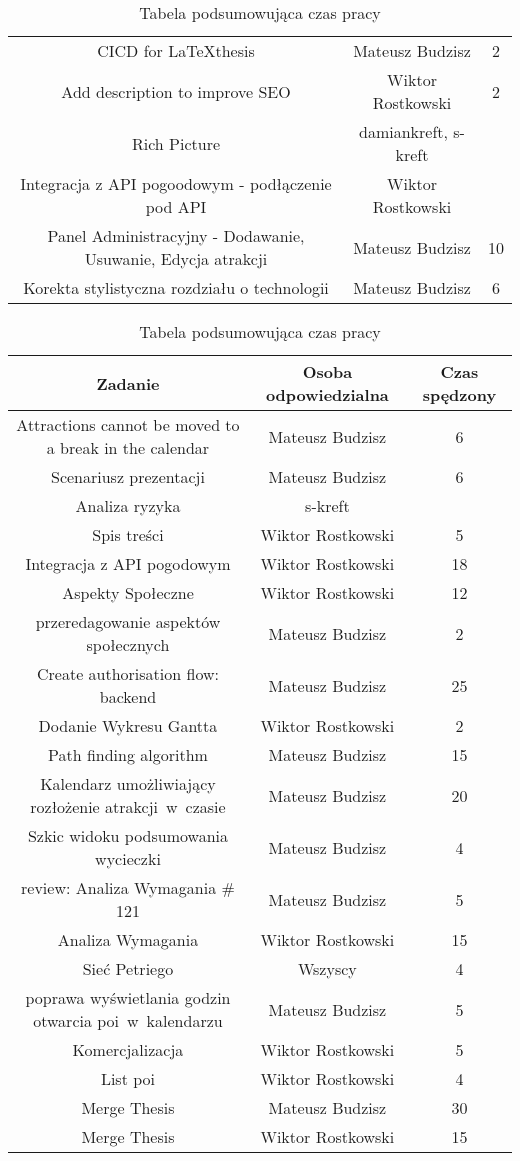 \begin{table}[h!]
\begin{tabular}{|c|c|c|}
CICD for \LaTeX thesis	&	Mateusz Budzisz	&	2	\\
Add description to improve SEO	&	Wiktor Rostkowski	&	2	\\
Rich Picture	&	damiankreft, s-kreft	&		\\
Integracja z API pogoodowym - podłączenie pod API	&	Wiktor Rostkowski	&		\\
Panel Administracyjny - Dodawanie, Usuwanie, Edycja atrakcji	&	Mateusz Budzisz	&	10	\\
Korekta stylistyczna rozdziału o technologii	&	Mateusz Budzisz	&	6	\\
\hline
\end{tabular}
\caption{Tabela podsumowująca czas pracy}
\label{tab:podsumowanie prac}
\end{table}

\begin{table}[h!]
    \centering
    \begin{tabular}{|c|c|c|}
        \hline					
        Zadanie	&	Osoba odpowiedzialna	& Czas spędzony\\
        \hline		
Attractions cannot be moved to a  break in the calendar	&	Mateusz Budzisz	&	6	\\
Scenariusz prezentacji	&	Mateusz Budzisz	&	6	\\
Analiza ryzyka	&	s-kreft	&		\\
Spis treści	&	Wiktor Rostkowski	&	5	\\
Integracja z API pogodowym 	&	Wiktor Rostkowski	&	18	\\
Aspekty Społeczne	&	Wiktor Rostkowski	&	12	\\
przeredagowanie aspektów społecznych	&	Mateusz Budzisz	&	2	\\
Create authorisation flow: backend 	&	Mateusz Budzisz	&	25	\\
Dodanie Wykresu Gantta	&	Wiktor Rostkowski	&	2	\\
Path finding algorithm	&	Mateusz Budzisz	&	15	\\
Kalendarz umożliwiający rozłożenie atrakcji~w~czasie	&	Mateusz Budzisz	&	20	\\
Szkic widoku podsumowania wycieczki	&	Mateusz Budzisz	&	4	\\
review: Analiza Wymagania \# 121	&	Mateusz Budzisz	&	5	\\
Analiza Wymagania	&	Wiktor Rostkowski	&	15	\\
Sieć Petriego	&	Wszyscy	&	4	\\
poprawa wyświetlania godzin otwarcia poi~w~kalendarzu	&	Mateusz Budzisz	&	5	\\
Komercjalizacja	&	Wiktor Rostkowski	&	5	\\
List poi	&	Wiktor Rostkowski	&	4	\\
Merge Thesis	&	Mateusz Budzisz	&	30	\\
Merge Thesis	&	Wiktor Rostkowski	&	15	\\
\hline
\end{tabular}
\caption{Tabela podsumowująca czas pracy}
\label{tab:podsumowanie prac}
\end{table}